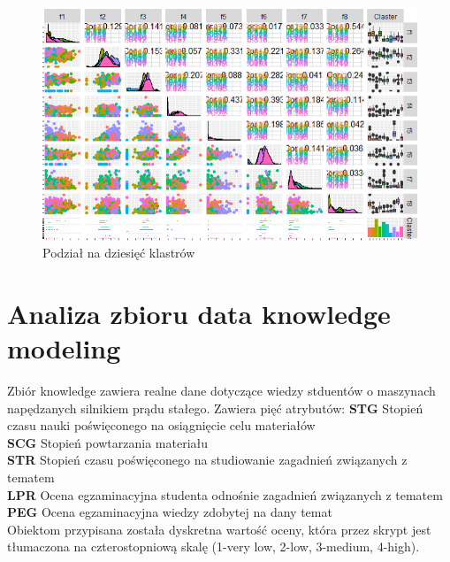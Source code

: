 \documentclass[12pt,a4paper]{article}
\begin{document}
\begin{figure}[H]
\centering
\includegraphics[width=1\textwidth]{diabetesP10.PNG}
\caption{Podział na dziesięć klastrów}
\end{figure}

\section{Analiza zbioru data knowledge modeling}
Zbiór knowledge zawiera realne dane dotyczące wiedzy stduentów o maszynach napędzanych silnikiem prądu stałego. Zawiera pięć atrybutów:
\textbf{STG} Stopień czasu nauki poświęconego na osiągnięcie celu materiałów\\
\textbf{SCG} Stopień powtarzania materiału\\
\textbf{STR} Stopień czasu poświęconego na studiowanie zagadnień związanych z tematem\\
\textbf{LPR} Ocena egzaminacyjna studenta odnośnie zagadnień związanych z tematem\\
\textbf{PEG} Ocena egzaminacyjna wiedzy zdobytej na dany temat\\

Obiektom przypisana została dyskretna wartość oceny, która przez skrypt jest tłumaczona na czterostopniową skalę (1-very low, 2-low, 3-medium, 4-high).
\end{document}
